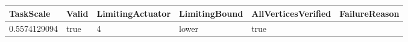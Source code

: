 \begin{tabular}{@{}llllll@{}}
\toprule
TaskScale & Valid & LimitingActuator & LimitingBound & AllVerticesVerified & FailureReason \\
\midrule
0.5574129094 & true & 4 & lower & true &  \\
\bottomrule
\end{tabular}

